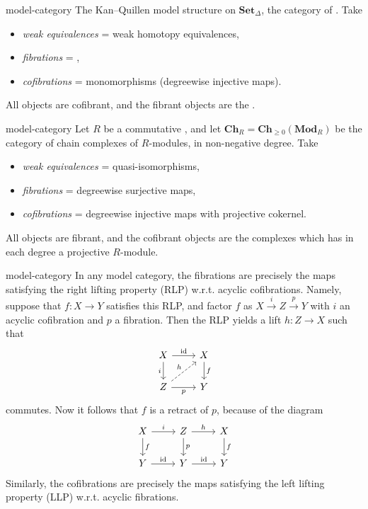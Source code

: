 \begin{example}{model-category}
    The Kan--Quillen model structure on $\textbf{Set}_\Delta$, the category of . Take
    \begin{itemize}
        \item \textit{weak equivalences} = weak homotopy equivalences,
        \item \textit{fibrations} = ,
        \item \textit{cofibrations} = monomorphisms (degreewise injective maps).
    \end{itemize}
    All objects are cofibrant, and the fibrant objects are the .
\end{example}

\begin{example}{model-category}
    Let $R$ be a commutative , and let $\textbf{Ch}_R = \textbf{Ch}_{\ge 0}(\textbf{Mod}_R)$ be the category of chain complexes of $R$-modules, in non-negative degree. Take
    \begin{itemize}
        \item \textit{weak equivalences} = quasi-isomorphisms,
        \item \textit{fibrations} = degreewise surjective maps,
        \item \textit{cofibrations} = degreewise injective maps with projective cokernel.
    \end{itemize}
    All objects are fibrant, and the cofibrant objects are the complexes which has in each degree a projective $R$-module.
\end{example}

\begin{example}{model-category}
    In any model category, the fibrations are precisely the maps satisfying the right lifting property (RLP) w.r.t. acyclic cofibrations. Namely, suppose that $f : X \to Y$ satisfies this RLP, and factor $f$ as $X \xrightarrow{i} Z \xrightarrow{p} Y$ with $i$ an acyclic cofibration and $p$ a fibration. Then the RLP yields a lift $h : Z \to X$ such that
    \[ \begin{tikzcd} X \arrow{r}{\id} \arrow[swap]{d}{i} & X \arrow{d}{f} \\ Z \arrow[dashed]{ur}{h} \arrow[swap]{r}{p} & Y \end{tikzcd} \]
    commutes. Now it follows that $f$ is a retract of $p$, because of the diagram
    \[ \begin{tikzcd} X \arrow{r}{i} \arrow{d}{f} & Z \arrow{d}{p} \arrow{r}{h} & X \arrow{d}{f} \\ Y \arrow{r}{\id} & Y \arrow{r}{\id} & Y \end{tikzcd} \]
    Similarly, the cofibrations are precisely the maps satisfying the left lifting property (LLP) w.r.t. acyclic fibrations.
\end{example}

